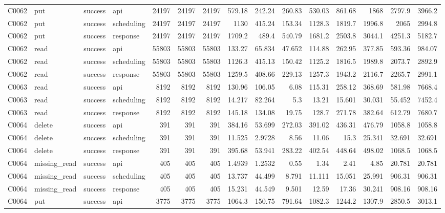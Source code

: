 \begin{landscape}
\begin{longtable}{llllrrrrrrrrrrr}
C0062 & put & success & api & 24197 & 24197 & 24197 & 579.18 & 242.24 & 260.83 & 530.03 & 861.68 & 1868 & 2797.9 & 3966.2\\
C0062 & put & success & scheduling & 24197 & 24197 & 24197 & 1130 & 415.24 & 153.34 & 1128.3 & 1819.7 & 1996.8 & 2065 & 2994.8\\
C0062 & put & success & response & 24197 & 24197 & 24197 & 1709.2 & 489.4 & 540.79 & 1681.2 & 2503.8 & 3044.1 & 4251.3 & 5182.7\\
C0062 & read & success & api & 55803 & 55803 & 55803 & 133.27 & 65.834 & 47.652 & 114.88 & 262.95 & 377.85 & 593.36 & 984.07\\
C0062 & read & success & scheduling & 55803 & 55803 & 55803 & 1126.3 & 415.13 & 150.42 & 1125.2 & 1816.5 & 1989.8 & 2073.7 & 2892.9\\
C0062 & read & success & response & 55803 & 55803 & 55803 & 1259.5 & 408.66 & 229.13 & 1257.3 & 1943.2 & 2116.7 & 2265.7 & 2991.1\\
C0063 & read & success & api & 8192 & 8192 & 8192 & 130.96 & 106.05 & 6.08 & 115.31 & 258.12 & 368.69 & 581.98 & 7668.4\\
C0063 & read & success & scheduling & 8192 & 8192 & 8192 & 14.217 & 82.264 & 5.3 & 13.21 & 15.601 & 30.031 & 55.452 & 7452.4\\
C0063 & read & success & response & 8192 & 8192 & 8192 & 145.18 & 134.08 & 19.75 & 128.7 & 271.78 & 382.64 & 612.79 & 7680.7\\
C0064 & delete & success & api & 391 & 391 & 391 & 384.16 & 53.699 & 272.03 & 391.02 & 436.31 & 476.79 & 1058.8 & 1058.8\\
C0064 & delete & success & scheduling & 391 & 391 & 391 & 11.525 & 2.9728 & 8.56 & 11.06 & 15.3 & 25.341 & 32.691 & 32.691\\
C0064 & delete & success & response & 391 & 391 & 391 & 395.68 & 53.941 & 283.22 & 402.54 & 448.64 & 498.02 & 1068.5 & 1068.5\\
C0064 & missing\_\allowbreak{}read & success & api & 405 & 405 & 405 & 1.4939 & 1.2532 & 0.55 & 1.34 & 2.41 & 4.85 & 20.781 & 20.781\\
C0064 & missing\_\allowbreak{}read & success & scheduling & 405 & 405 & 405 & 13.737 & 44.499 & 8.791 & 11.111 & 15.051 & 25.991 & 906.31 & 906.31\\
C0064 & missing\_\allowbreak{}read & success & response & 405 & 405 & 405 & 15.231 & 44.549 & 9.501 & 12.59 & 17.36 & 30.241 & 908.16 & 908.16\\
C0064 & put & success & api & 3775 & 3775 & 3775 & 1064.3 & 150.75 & 791.64 & 1082.3 & 1244.2 & 1307.9 & 2850.5 & 3013.1\\

\end{longtable}
\end{landscape}
